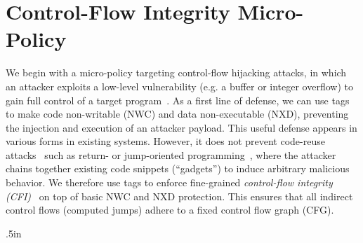 
\section{Control-Flow Integrity Micro-Policy}

We begin with a micro-policy targeting control-flow hijacking attacks,
in which an attacker exploits a low-level vulnerability (e.g. a buffer
or integer overflow) to gain full control of a target program~\cite{
  ShellcoderHandbook, Szekeres2013, Smashing1996, SkyLined, PincusB04,
  Sotirov07, DanielHM08, AfekS07, Dobrovitski03}.
%
As a first line of defense, we can use tags to make code non-writable
(NWC) and data non-executable (NXD), preventing the injection and
execution of an attacker payload.
%
This useful defense appears in various forms in existing systems.
However, it does not prevent code-reuse attacks~\cite{Newsham1997,
  SolarDesigner1997, McDonald1999, Shacham07, Checkoway2010,
  Buchanan2008, SnowMDDLS13, outofcontrol_ieeesp2014} such as return- or
jump-oriented programming~\cite{Shacham07, Checkoway2010}, where the
attacker chains together existing code snippets (``gadgets'') to induce
arbitrary malicious behavior.
%
We therefore use tags to enforce fine-grained {\em control-flow integrity
  (CFI)}~\cite{AbadiBEL09, ZhaoLSR11, Zhang2013, CriswellDA14, NiuT14,
  ZhaoLSR11, CriswellDA14} on top of basic NWC and NXD protection.
%
This ensures that all indirect control flows (computed jumps) adhere
to a fixed control flow graph (CFG).

\newcommand{\CODEname}[0]{\ii{Code}}
\newcommand{\CODE}[1]{\CODEname~#1}

\makeatletter
\newdimen\OPCODEwidth
\OPCODEwidth .5in
\newdimen\RULEwidth
\newcommand{\TRUE}{\text{\tt true}}
\newcommand{\RULE}[9]{
\gdef\RULEARROW{\ifthenelse{\equal{#7}{}}{\Rightarrow}{\rightarrow}}  %
\gdef\RULEINPUT{(#2,#3,#4,#5,#6)}
\gdef\RULEOUTPUT{(#8,#9)}
\gdef\RULECOND{%
  \ifthenelse{\equal{#7}{}}{}%
             {\ifthenelse{\equal{#7}{\TRUE}}{}%
                         {\mathrm{\;if\;}#7}}%
}
&& \hspace*{-18.5em}
  \hbox to 1in {
      \hbox to \OPCODEwidth {\ifx&#1&\else$#1$\ : \fi}
      \setbox \@tempboxa \hbox{$\RULEINPUT \RULEARROW \RULEOUTPUT \RULECOND$}
      \RULEwidth \wd\@tempboxa
      \ifdim \RULEwidth < 2.4in
        \box\@tempboxa
      \else\ifdim \RULEwidth < 4.8in
        $ \hspace*{-1.3em}
        \begin{array}[t]{@{}l@{\ }l}
            & \RULEINPUT \\
            \RULEARROW
            & \RULEOUTPUT\RULECOND
        \end{array}
       $
      \else
        $ \hspace*{-1.3em}
        \begin{array}[t]{@{}l@{}l}
            & \ \RULEINPUT \\
            \RULEARROW
            & \ \RULEOUTPUT \\
            & \RULECOND
        \end{array}
       $
     \fi\fi
  }
}


